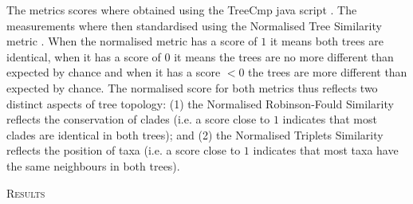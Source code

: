 \documentclass[12pt,letterpaper]{article}
\renewcommand{\section}[1]{%
\bigskip
\begin{center}
\begin{Large}
\normalfont\scshape #1
\medskip
\end{Large}
\end{center}}
\renewcommand{\subsection}[1]{%
\bigskip
\begin{center}
\begin{large}
\normalfont\itshape #1
\end{large}
\end{center}}
\begin{document}
The metrics scores where obtained using the TreeCmp java script \citep{Bogdanowicz2012}.
The measurements where then standardised using the Normalised Tree Similarity metric \citep[i.e. centering the metrics scores using the mean metric score for 1000 pairwise comparisons between random trees with $n$ taxa;][]{Bogdanowicz2012,Guillerme2016146}.
When the normalised metric has a score of $1$ it means both trees are identical, when it has a score of $0$ it means the trees are no more different than expected by chance and when it has a score $<0$ the trees are more different than expected by chance.
The normalised score for both metrics thus reflects two distinct aspects of tree topology: (1) the Normalised Robinson-Fould Similarity reflects the conservation of clades (i.e. a score close to $1$ indicates that most clades are identical in both trees); and (2) the Normalised Triplets Similarity reflects the position of taxa (i.e. a score close to $1$ indicates that most taxa have the same neighbours in both trees).



\section{Results}
\end{document}
